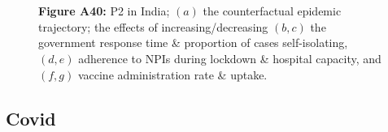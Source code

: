\documentclass[paper=a4,fontsize=11pt]{article}
\begin{document}
\begin{figure}[!h]
  \\
  \hspace{1.76cm}
  \\
  \caption*{\textbf{Figure A40:} P2 in India; $(a)$ the counterfactual epidemic trajectory; the effects of increasing/decreasing $(b,c)$ the government response time \& proportion of cases self-isolating, $(d,e)$ adherence to NPIs during lockdown \& hospital capacity, and $(f,g)$ vaccine administration rate \& uptake.}
\end{figure}


\subsection{Covid}
\end{document}
